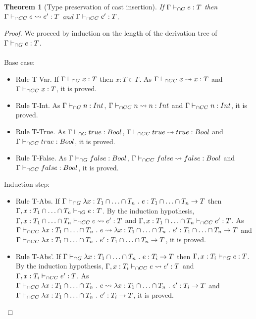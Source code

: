 \documentclass[a4paper]{article}
\newtheorem{theorem}{Theorem}
\begin{document}
\begin{theorem}[Type preservation of cast insertion]
\label{type_preservation_cast_insertion}
If $\Gamma \vdash_{\cap G} e : T$ then $\Gamma \vdash_{\cap CC} e \leadsto e' : T$ and $\Gamma \vdash_{\cap CC} e' : T$.
\end{theorem}
\begin{proof}
We proceed by induction on the length of the derivation tree of $\Gamma \vdash_{\cap G} e : T$.\\\\
Base case:
\begin{itemize}
    \item Rule T-Var.
    If $\Gamma \vdash_{\cap G} x : T$ then $x : T \in \Gamma$.
    As $\Gamma \vdash_{\cap CC} x \leadsto x : T$ and $\Gamma \vdash_{\cap CC} x : T$, it is proved.
    \item Rule T-Int.
    As $\Gamma \vdash_{\cap G} n : {Int}$, $\Gamma \vdash_{\cap CC} n \leadsto n : {Int}$ and $\Gamma \vdash_{\cap CC} n : {Int}$, it is proved.
    \item Rule T-True.
    As $\Gamma \vdash_{\cap G} true : Bool$, $\Gamma \vdash_{\cap CC} true \leadsto true : Bool$ and $\Gamma \vdash_{\cap CC} true : Bool$, it is proved.
    \item Rule T-False.
    As $\Gamma \vdash_{\cap G} false : Bool$, $\Gamma \vdash_{\cap CC} false \leadsto false : Bool$ and $\Gamma \vdash_{\cap CC} false : Bool$, it is proved.
\end{itemize}
Induction step:
\begin{itemize}
    \item Rule T-Abs.
    If $\Gamma \vdash_{\cap G} \lambda x : T_1 \cap \ldots \cap T_n\ .\ e : T_1 \cap \ldots \cap T_n \rightarrow T$ then $\Gamma, x : T_1 \cap \ldots \cap T_n \vdash_{\cap G} e : T$.
    By the induction hypothesis, $\Gamma, x : T_1 \cap \ldots \cap T_n \vdash_{\cap CC} e \leadsto e' : T$ and $\Gamma, x : T_1 \cap \ldots \cap T_n \vdash_{\cap CC} e' : T$.
    As $\Gamma \iccts \lambda x : T_1 \cap \ldots \cap T_n\ .\ e \leadsto \lambda x : T_1 \cap \ldots \cap T_n\ .\ e' : T_1 \cap \ldots \cap T_n \rightarrow T$ and $\Gamma \iccts \lambda x : T_1 \cap \ldots \cap T_n\ .\ e' : T_1 \cap \ldots \cap T_n \rightarrow T$, it is proved.
    \item Rule T-Abs'.
    If $\Gamma \vdash_{\cap G} \lambda x : T_1 \cap \ldots \cap T_n\ .\ e : T_i \rightarrow T$ then $\Gamma, x : T_i \vdash_{\cap G} e : T$.
    By the induction hypothesis, $\Gamma, x : T_i \vdash_{\cap CC} e \leadsto e' : T$ and $\Gamma, x : T_i \vdash_{\cap CC} e' : T$.
    As $\Gamma \vdash_{\cap CC} \lambda x : T_1 \cap \ldots \cap T_n\ .\ e \leadsto \lambda x : T_1 \cap \ldots \cap T_n\ .\ e' : T_i \rightarrow T$ and $\Gamma \iccts \lambda x : T_1 \cap \ldots \cap T_n\ .\ e' : T_i \rightarrow T$, it is proved.

\end{itemize}
\end{proof}
\end{document}
